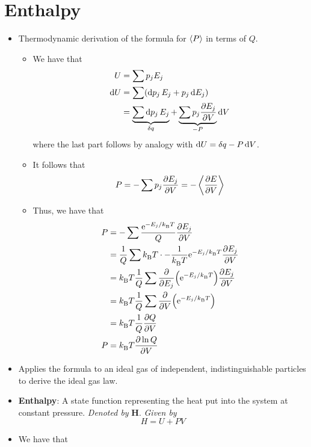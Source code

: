 \documentclass[../notes.tex]{subfiles}
\begin{document}
\section{Enthalpy}
\begin{itemize}
    \item {}Thermodynamic derivation of the formula for $\prb{P}$ in terms of $Q$.
    \begin{itemize}
        \item We have that
        \begin{align*}
            U &= \sum p_jE_j\\
            \dd{U} &= \sum(\dd{p_j}E_j+p_j\dd{E_j})\\
            &= \underbrace{\sum\dd{p_j}E_j}_{\var{q}}+\underbrace{\sum p_j\pdv{E_j}{V}}_{-P}\dd{V}
        \end{align*}
        where the last part follows by analogy with $\dd{U}=\var{q}-P\dd{V}$.
        \item It follows that
        \begin{equation*}
            P = -\sum p_j\pdv{E_j}{V} = -\prb{\pdv{E}{V}}
        \end{equation*}
        \item Thus, we have that
        \begin{align*}
            P &= -\sum\frac{\e[-E_j/\kB T]}{Q}\pdv{E_j}{V}\\
            &= \frac{1}{Q}\sum \kB T\cdot-\frac{1}{\kB T}\e[-E_j/\kB T]\pdv{E_j}{V}\\
            &= \kB T\frac{1}{Q}\sum\pdv{E_j}(\e[-E_j/\kB T])\pdv{E_j}{V}\\
            &= \kB T\frac{1}{Q}\sum\pdv{V}(\e[-E_j/\kB T])\\
            &= \kB T\frac{1}{Q}\pdv{Q}{V}\\
            P &= \kB T\pdv{\ln Q}{V}
        \end{align*}
    \end{itemize}
    \item Applies the formula to an ideal gas of independent, indistinguishable particles to derive the ideal gas law.
    \item \textbf{Enthalpy}: A state function representing the heat put into the system at constant pressure. \emph{Denoted by} $\bm{H}$. \emph{Given by}
    \begin{equation*}
        H = U+PV
    \end{equation*}
    \item We have that
    \begin{align*}

\end{align*}
\end{itemize}
\end{document}
